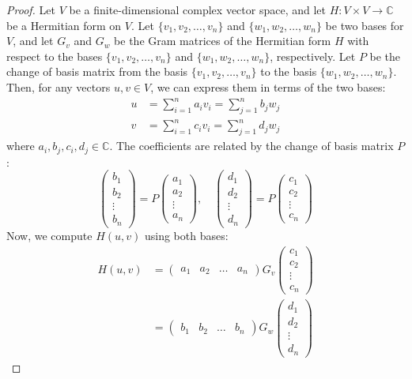 \documentclass[openany]{book}
\renewcommand{\C}{\mathbb{C}}
\begin{document}
\begin{proof}
Let $V$ be a finite-dimensional complex vector space, and let $H: V \times V \to \C$ be a Hermitian form on $V$. Let $\{v_1, v_2, \ldots, v_n\}$ and $\{w_1, w_2, \ldots, w_n\}$ be two bases for $V$, and let $G_v$ and $G_w$ be the Gram matrices of the Hermitian form $H$ with respect to the bases $\{v_1, v_2, \ldots, v_n\}$ and $\{w_1, w_2, \ldots, w_n\}$, respectively. Let $P$ be the change of basis matrix from the basis $\{v_1, v_2, \ldots, v_n\}$ to the basis $\{w_1, w_2, \ldots, w_n\}$. Then, for any vectors $u, v \in V$, we can express them in terms of the two bases:
\[\begin{aligned}
u &= \sum_{i=1}^n a_i v_i = \sum_{j=1}^n b_j w_j \\
v &= \sum_{i=1}^n c_i v_i = \sum_{j=1}^n d_j w_j
\end{aligned}\]
where $a_i, b_j, c_i, d_j \in \C$. The coefficients are related by the change of basis matrix $P$:
$$\begin{pmatrix} b_1 \\ b_2 \\ \vdots \\ b_n \end{pmatrix} = P \begin{pmatrix} a_1 \\ a_2 \\ \vdots \\ a_n \end{pmatrix}, \quad \begin{pmatrix} d_1 \\ d_2 \\ \vdots \\ d_n \end{pmatrix} = P \begin{pmatrix} c_1 \\ c_2 \\ \vdots \\ c_n \end{pmatrix}$$
Now, we compute $H(u, v)$ using both bases:
\[\begin{aligned}
H(u, v) &= \begin{pmatrix} a_1 & a_2 & \ldots & a_n \end{pmatrix} G_v \begin{pmatrix} c_1 \\ c_2 \\ \vdots \\ c_n \end{pmatrix} \\
&= \begin{pmatrix} b_1 & b_2 & \ldots & b_n \end{pmatrix} G_w \begin{pmatrix} d_1 \\ d_2 \\ \vdots \\ d_n \end{pmatrix}

\end{aligned}\]
\end{proof}
\end{document}
